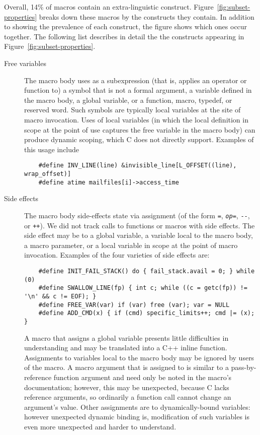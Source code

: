 \documentclass[10pt]{article}
\begin{document}

Overall, 14\% of macros contain an extra-linguistic construct.
Figure~\ref{fig:subset-properties} breaks down these macros by the
constructs they contain.  In addition to showing the prevalence of each
construct, the figure shows which ones occur together.  The following list
describes in detail the the constructs appearing in
Figure~\ref{fig:subset-properties}.

\label{desc:properties}

\begin{description}
\item[Free variables]\label{page:freevar}
  The macro body uses as a subexpression (that is, applies an operator or
  function to) a symbol that is not a formal argument, a variable defined
  in the macro body, a global variable, or a function, macro, typedef, or
  reserved word.  Such symbols are typically local variables at the site of
  macro invocation.  Uses of local variables (in which the local definition
  in scope at the point of use captures the free variable in the macro
  body) can produce dynamic scoping, which C does not directly support.
  Examples of this usage include
\begin{verbatim}
    #define INV_LINE(line) &invisible_line[L_OFFSET((line), wrap_offset)]
    #define atime mailfiles[i]->access_time
\end{verbatim}

\item[Side effects]
  The macro body side-effects state via assignment (of the form {\tt =},
  {\tt {\em op}=}, {\tt -{}-}, or {\tt ++}).  We did not track calls to
  functions or macros with side effects.  The side effect may be to a
  global variable, a variable local to the macro body, a macro parameter,
  or a local variable in scope at the point of macro invocation.
  Examples of the four varieties of side effects are:
\begin{verbatim}
    #define INIT_FAIL_STACK() do { fail_stack.avail = 0; } while (0)
    #define SWALLOW_LINE(fp) { int c; while ((c = getc(fp)) != '\n' && c != EOF); }
    #define FREE_VAR(var) if (var) free (var); var = NULL
    #define ADD_CMD(x) { if (cmd) specific_limits++; cmd |= (x); }
\end{verbatim}

  A macro that assigns a global variable presents little difficulties in
  understanding and may be translated into a C++ inline function.
  Assignments to variables local to the macro body may be ignored by users
  of the macro.  A macro argument that is assigned to is similar to a
  pass-by-reference function argument and need only be noted in the macro's
  documentation; however, this may be unexpected, because C lacks reference
  arguments, so ordinarily a function call cannot change an argument's
  value.  Other assignments are to dynamically-bound variables:  however
  unexpected dynamic binding is, modification of such variables is even
  more unexpected and harder to understand.
  


\end{description}
\end{document}
